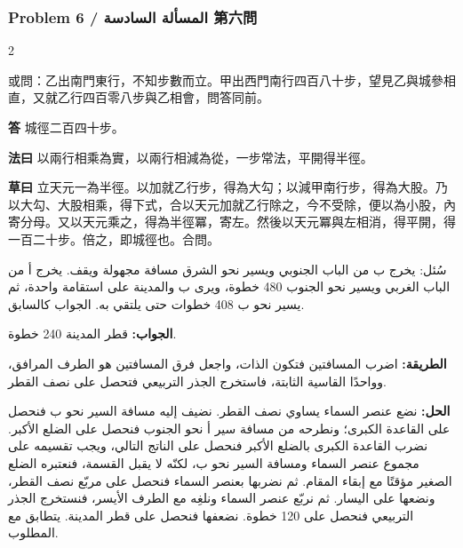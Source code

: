 \documentclass[11pt,a4paper]{article}
\newcommand{\ar}[1]{\arabicfont\beginR #1\endR}
\newcommand{\Answer}[1]{\par\noindent\textbf{\color{problemcolor}答} #1\par}
\newcommand{\Method}[1]{\par\noindent\textbf{\color{problemcolor}法曰} #1\par}
\newcommand{\Workings}[1]{\par\noindent\textbf{\color{problemcolor}草曰} #1\par}
\newcommand{\AnswerAr}{\par\noindent\textbf{\color{problemcolor}\ar{الجواب:}} }
\newcommand{\MethodAr}{\par\noindent\textbf{\color{problemcolor}\ar{الطريقة:}} }
\newcommand{\WorkingsAr}{\par\noindent\textbf{\color{problemcolor}\ar{الحل:}} }
\begin{document}
\vspace{0.5cm}


\subsubsection*{Problem 6 / \ar{المسألة السادسة} \quad 第六問}

\begin{paracol}{2}

\noindent 或問：乙出南門東行，不知步數而立。甲出西門南行四百八十步，望見乙與城參相直，又就乙行四百零八步與乙相會，問答同前。

\vspace{0.2cm}

\Answer{城徑二百四十步。}

\vspace{0.2cm}

\Method{以兩行相乘為實，以兩行相減為從，一步常法，平開得半徑。}

\vspace{0.2cm}

\Workings{立天元一為半徑。以加就乙行步，得為大勾；以減甲南行步，得為大股。乃以大勾、大股相乘，得下式，合以天元加就乙行除之，今不受除，便以為小股，內寄分母。又以天元乘之，得為半徑冪，寄左。然後以天元冪與左相消，得平開，得一百二十步。倍之，即城徑也。合問。}

\switchcolumn

\ar{سُئل: يخرج ب من الباب الجنوبي ويسير نحو الشرق مسافة مجهولة ويقف. يخرج أ من الباب الغربي ويسير نحو الجنوب 480 خطوة، ويرى ب والمدينة على استقامة واحدة، ثم يسير نحو ب 408 خطوات حتى يلتقي به. الجواب كالسابق.}

\vspace{0.2cm}

\AnswerAr{قطر المدينة 240 خطوة.}

\vspace{0.2cm}

\MethodAr{اضرب المسافتين فتكون الذات، واجعل فرق المسافتين هو الطرف المرافق، وواحدًا القاسية الثابتة، فاستخرج الجذر التربيعي فتحصل على نصف القطر.}

\vspace{0.2cm}

\WorkingsAr{نضع عنصر السماء يساوي نصف القطر. نضيف إليه مسافة السير نحو ب فنحصل على القاعدة الكبرى؛ ونطرحه من مسافة سير أ نحو الجنوب فنحصل على الضلع الأكبر. نضرب القاعدة الكبرى بالضلع الأكبر فنحصل على الناتج التالي، ويجب تقسيمه على مجموع عنصر السماء ومسافة السير نحو ب، لكنّه لا يقبل القسمة، فنعتبره الضلع الصغير مؤقتًا مع إبقاء المقام. ثم نضربها بعنصر السماء فنحصل على مربّع نصف القطر، ونضعها على اليسار. ثم نربّع عنصر السماء ونلغِه مع الطرف الأيسر، فنستخرج الجذر التربيعي فنحصل على 120 خطوة. نضعفها فنحصل على قطر المدينة. يتطابق مع المطلوب.}

\end{paracol}
\end{document}
